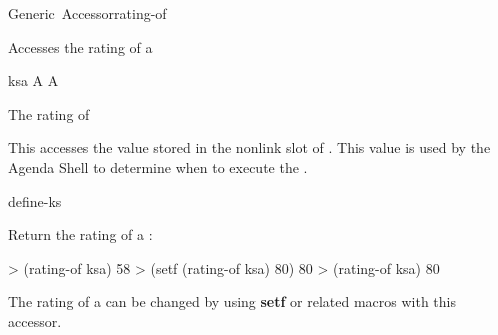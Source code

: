 \documentclass[10pt,twoside,english,pdftex]{article}
\begin{document}
\begin{functiondoc}{Generic~Accessor}{rating-of}{ 
    \returns{} }
%

\fnsyntax

\fnpurpose Accesses the rating of a 

\fnsetf
{}

\fnmethods
{}

\fnpackage {}

\fnmodule {}

\fnargs
\begin{args}{ksa}
\arg[ksa] A 
\arg[rating] A 
\end{args}

\fnreturns The rating of 
  
\fndescription 
This  accesses the value stored in the
 nonlink slot of .  This value is used by the
Agenda Shell to determine when to execute the .

\begin{alsos}{define-ks}
\also[define-ks]
\also[ks]
\also[ksa]
\end{alsos}

\fnexamples
Return the rating of a :
%
\W\supp
\begin{example}
> (rating-of ksa)
58
> (setf (rating-of ksa) 80)
80
> (rating-of ksa)
80
\end{example}

\fnnote 
The rating of a  can be changed by using {\bf setf} or
related macros with this accessor.

\end{functiondoc}

\end{document}
